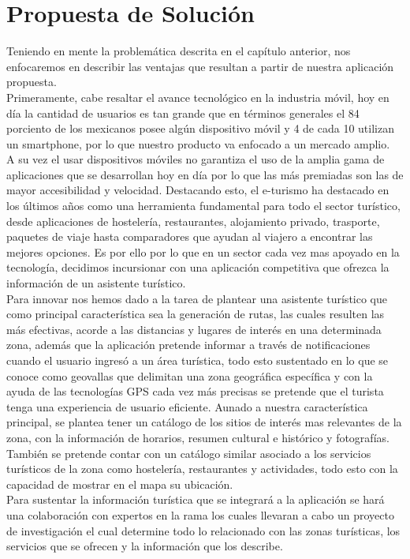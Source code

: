 \section{Propuesta de Solución}

Teniendo en mente la problemática descrita en el capítulo anterior, nos enfocaremos en describir las ventajas que resultan a partir de nuestra aplicación propuesta.\\ 

Primeramente, cabe resaltar el avance tecnológico en la industria móvil, hoy en día la cantidad de usuarios es tan grande que en términos generales el 84 porciento de los mexicanos posee algún dispositivo móvil y 4 de cada 10 utilizan un smartphone, por lo que nuestro producto va enfocado a un mercado amplio.\\ 

A su vez el usar dispositivos móviles no garantiza el uso de la amplia gama de aplicaciones que se desarrollan hoy en día por lo que las más premiadas son las de mayor accesibilidad y velocidad. Destacando esto, el e-turismo ha destacado en los últimos años como una herramienta fundamental para todo el sector turístico, desde aplicaciones de hostelería, restaurantes, alojamiento privado, trasporte, paquetes de viaje hasta comparadores que ayudan al viajero a encontrar las mejores opciones. Es por ello por lo que en un sector cada vez mas apoyado en la tecnología, decidimos incursionar con una aplicación competitiva que ofrezca la información de un asistente turístico.\\


Para innovar nos hemos dado a la tarea de plantear una asistente turístico que como principal característica sea la generación de rutas, las cuales resulten las más efectivas, acorde a las distancias y lugares de interés en una determinada zona, además que la aplicación pretende informar a través de notificaciones cuando el usuario ingresó a un área turística, todo esto sustentado en lo que se conoce como geovallas que delimitan una zona geográfica específica y con la ayuda de las tecnologías GPS cada vez más precisas se pretende que el turista tenga una experiencia de usuario eficiente. 
Aunado a nuestra característica principal, se plantea tener un catálogo de los sitios de interés mas relevantes de la zona, con la información de horarios, resumen cultural e histórico y fotografías. También se pretende contar con un catálogo similar asociado a los servicios turísticos de la zona como hostelería, restaurantes y actividades, todo esto con la capacidad de mostrar en el mapa su ubicación.\\

Para sustentar la información turística que se integrará a la aplicación se hará una colaboración con expertos en la rama los cuales llevaran a cabo un proyecto de investigación el cual determine todo lo relacionado con las zonas turísticas, los servicios que se ofrecen y la información que los describe.